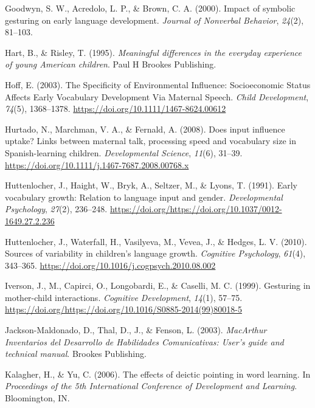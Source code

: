 \documentclass[
  english,
  man,floatsintext]{apa6}
\begin{document}
\leavevmode\hypertarget{ref-goodwyn2000impact}{}%
Goodwyn, S. W., Acredolo, L. P., \& Brown, C. A. (2000). Impact of symbolic gesturing on early language development. \emph{Journal of Nonverbal Behavior}, \emph{24}(2), 81--103.

\leavevmode\hypertarget{ref-hart_meaningful_1995}{}%
Hart, B., \& Risley, T. (1995). \emph{Meaningful differences in the everyday experience of young American children}. Paul H Brookes Publishing.

\leavevmode\hypertarget{ref-hoff_specificity_2003}{}%
Hoff, E. (2003). The Specificity of Environmental Influence: Socioeconomic Status Affects Early Vocabulary Development Via Maternal Speech. \emph{Child Development}, \emph{74}(5), 1368--1378. \url{https://doi.org/10.1111/1467-8624.00612}

\leavevmode\hypertarget{ref-hurtado_does_2008}{}%
Hurtado, N., Marchman, V. A., \& Fernald, A. (2008). Does input influence uptake? Links between maternal talk, processing speed and vocabulary size in Spanish-learning children. \emph{Developmental Science}, \emph{11}(6), 31--39. \url{https://doi.org/10.1111/j.1467-7687.2008.00768.x}

\leavevmode\hypertarget{ref-huttenlocher_early_1991}{}%
Huttenlocher, J., Haight, W., Bryk, A., Seltzer, M., \& Lyons, T. (1991). Early vocabulary growth: Relation to language input and gender. \emph{Developmental Psychology}, \emph{27}(2), 236--248. \url{https://doi.org/https://doi.org/10.1037/0012-1649.27.2.236}

\leavevmode\hypertarget{ref-huttenlocher_sources_2010}{}%
Huttenlocher, J., Waterfall, H., Vasilyeva, M., Vevea, J., \& Hedges, L. V. (2010). Sources of variability in children's language growth. \emph{Cognitive Psychology}, \emph{61}(4), 343--365. \url{https://doi.org/10.1016/j.cogpsych.2010.08.002}

\leavevmode\hypertarget{ref-iverson_gesturing_1999}{}%
Iverson, J., M., Capirci, O., Longobardi, E., \& Caselli, M. C. (1999). Gesturing in mother-child interactions. \emph{Cognitive Development}, \emph{14}(1), 57--75. \url{https://doi.org/https://doi.org/10.1016/S0885-2014(99)80018-5}

\leavevmode\hypertarget{ref-jackson-maldonado_macarthur_2003}{}%
Jackson-Maldonado, D., Thal, D., J., \& Fenson, L. (2003). \emph{MacArthur Inventarios del Desarrollo de Habilidades Comunicativas: User's guide and technical manual}. Brookes Publishing.

\leavevmode\hypertarget{ref-kalagher_effects_2006}{}%
Kalagher, H., \& Yu, C. (2006). The effects of deictic pointing in word learning. In \emph{Proceedings of the 5th International Conference of Development and Learning}. Bloomington, IN.
\end{document}
